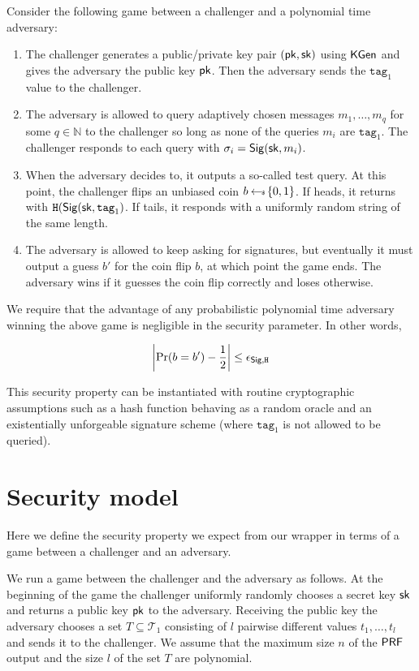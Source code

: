 \documentclass{article}
\begin{document}
Consider the following game between a challenger and a polynomial time adversary:

\begin{enumerate}
\item The challenger generates a public/private key pair $(\mathsf{pk}, \mathsf{sk})$ using $\mathsf{KGen}$ and gives the adversary the public key $\mathsf{pk}$. Then the adversary sends the $\mathrm{\texttt{tag}_1}$ value to the challenger.

\item The adversary is allowed to query adaptively chosen messages $m_1,
	\dots , m_q$ for some $q \in \mathbb{N}$ to the challenger so long as none of the queries $m_i$ are $\texttt{tag}_1$. The
		challenger responds to each query with $\sigma_{i}=
		\mathsf{Sig}{(\mathsf{sk}, m_i})$. 

\item When the adversary decides to, it outputs a so-called test query. At this point, the challenger flips an unbiased coin $b \hskip2.3pt{\gets\!\!\mbox{\tiny${\$}$\normalsize}}\, \{0, 1\}$. If heads, it returns with $ \texttt{H}(\mathsf{Sig} (\mathsf{sk}, \mathrm{\texttt{tag}_1})$. If tails, it responds with a uniformly random string of the same length.

\item The adversary is allowed to keep asking for signatures, but eventually it must output a guess $b'$ for the coin flip $b$, at which point the game ends. The adversary wins if it guesses the coin flip correctly and loses otherwise.
\end{enumerate}

We require that the advantage of any probabilistic polynomial time adversary winning the above game is negligible in the security parameter. In other words,

$$\left \vert \Pr(b = b') -\frac{1}{2} \right \vert \le \epsilon_{\mathsf{Sig}, \texttt{H}}$$

This security property can be instantiated with routine cryptographic assumptions such as a hash function behaving as a random oracle and an existentially unforgeable signature scheme (where $\texttt{tag}_1$ is not allowed to be queried).

\section{Security model} \label{sec:model}
Here we define the security property we expect from our wrapper in terms of a game between a challenger and an adversary.

We run a game between the challenger and the adversary as follows. At the beginning of the game the challenger uniformly randomly chooses a secret key $\mathsf{sk}$ and returns a public key $\mathsf{pk}$ to the adversary. Receiving the public key the adversary chooses a set $T \subseteq \mathcal{T}_1$ consisting of $l$ pairwise different values $t_1,\ldots,t_l$ and sends it to the challenger.  We assume that the maximum size $n$ of the $\mathsf{PRF}$ output and the size $l$ of the set $T$ are polynomial. 
\end{document}
